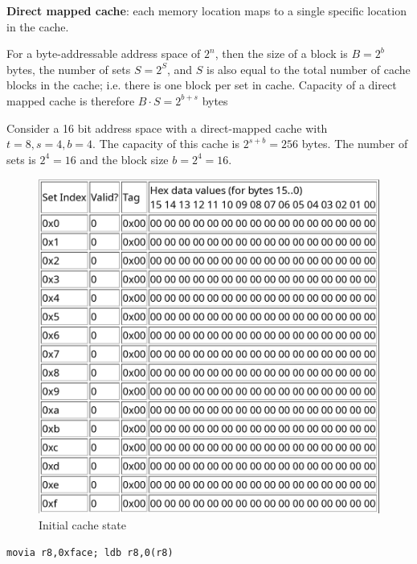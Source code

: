 \documentclass[../notes.tex]{subfiles}
\begin{document}
\begin{definition}
	
\textbf{Direct mapped cache}: each memory location maps to a single specific location in the cache.


For a byte-addressable address space of $ 2^n $, then the size of a block is $ B = 2^b $ bytes, the number of sets $ S = 2^S $, and $ S $ is also equal to the total number of cache blocks in the cache; i.e. there is one block per set in cache. Capacity of a direct mapped cache is therefore $ B \cdot  S = 2^{b+s} $ bytes


\begin{example}



	Consider a 16 bit address space with a direct-mapped cache with $ t = 8, s = 4, b = 4 $.
	The capacity of this cache is $ 2^{s+b} = 256 $ bytes. The number of sets is $ 2^4 = 16 $ and the block size $ b = 2^4 = 16 $.


	\begin{figure}[H]
		\centering
		\includegraphics[width=0.8\linewidth]{img/image_2022-11-24-13-50-47.png}
		\caption{Initial cache state}
	\end{figure}


	\texttt{movia r8,0xface; ldb r8,0(r8) }


\end{example}
\end{definition}
\end{document}
